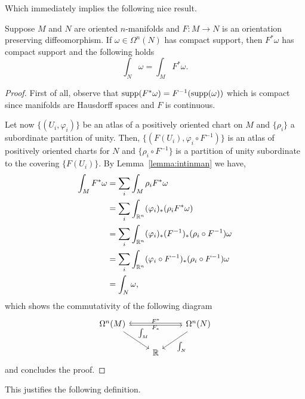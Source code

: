 Which immediately implies the following nice result.
\begin{theorem}\label{thm:gcv}
  Suppose $M$ and $N$ are oriented $n$-manifolds and $F:M\to N$ is an orientation preserving diffeomorphism.
  If $\omega\in\Omega^n(N)$ has compact support, then $F^*\omega$ has compact support and the following holds
  \begin{equation}
    \int_N \omega = \int_M F^* \omega.
  \end{equation}
\end{theorem}
\begin{proof}
  First of all, observe that $\operatorname{supp}(F^*\omega) = F^{-1}(\operatorname{supp}(\omega))$ which is compact since manifolds are Hausdorff spaces and $F$ is continuous.

  Let now $\{(U_i,\varphi_i)\}$ be an atlas of a positively oriented chart on $M$ and $\{\rho_i\}$ a subordinate partition of unity.
  Then, $\{(F(U_i),\varphi_i\circ F^{-1})\}$ is an atlas of positively oriented charts for $N$ and $\{\rho_i \circ F^{-1}\}$ is a partition of unity subordinate to the covering $\{F(U_i)\}$.
  By Lemma~\ref{lemma:intinman} we have,
  \begin{align}
    \int_M F^*\omega & = \sum_i \int_M \rho_i F^*\omega                                           \\
                     & = \sum_i \int_{\mathbb{R}^n}(\varphi_i)_*(\rho_i F^*\omega)                        \\
                     & = \sum_i \int_{\mathbb{R}^n}(\varphi_i)_*(F^{-1})_*(\rho_i \circ F^{-1}) \omega    \\
                     & = \sum_i \int_{\mathbb{R}^n}(\varphi_i \circ F^{-1})_*(\rho_i \circ F^{-1}) \omega \\
                     & = \int_N\omega,
  \end{align}
  which shows the commutativity of the following diagram
  \begin{equation}
    \begin{tikzcd}
      \Omega^n(M)
      \arrow[rr, "F^*", above, shift right = 0.5]
      \arrow[dr, "\int_M", below left]
      & & \Omega^n(N)
      \arrow[ll, "F_*", below, shift right = 0.5]
      \arrow[dl, "\int_N"] \\
      & \R &
    \end{tikzcd}
  \end{equation}
  and concludes the proof.
\end{proof}

This justifies the following definition.

